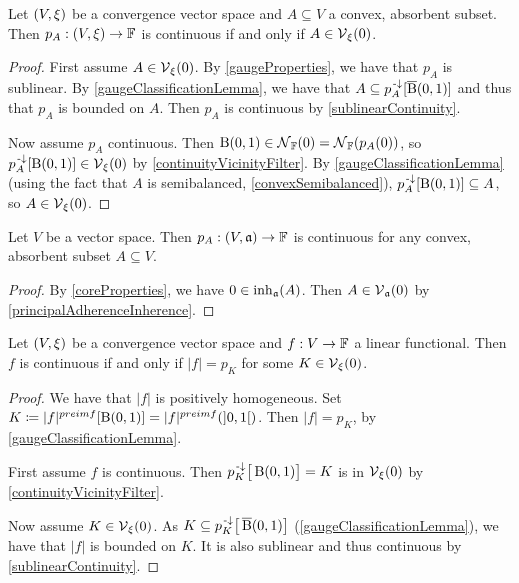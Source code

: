 \begin{proposition} \label{continuityConvexGauge}
Let $\left( V, \xi \right)$ be a convergence vector space and $A\subseteq V$ a convex, absorbent subset. Then $p_A: \left( V,\xi \right) \to \mathbb{F}$ is continuous \textup{if and only if} $A\in\operatorname{\mathcal{V}}_\xi(0)$.
\end{proposition}
\begin{proof}
First assume $A\in\operatorname{\mathcal{V}}_\xi(0)$. By \ref{gaugeProperties}, we have that $p_A$ is sublinear. By \ref{gaugeClassificationLemma}, we have that $A \subseteq p_A^{\text{\hspace{0.15em}-}\downarrow}[\operatorname{\overline{B}}(0,1)]$ and thus that $p_A$ is bounded on $A$. Then $p_A$ is continuous by \ref{sublinearContinuity}.

Now assume $p_A$ continuous. Then $\operatorname{B}(0,1) \in \operatorname{\mathcal{N}}_{\mathbb{F}}(0) = \operatorname{\mathcal{N}}_{\mathbb{F}}(p_A(0))$, so $p_A^{\text{\hspace{0.15em}-}\downarrow}[\operatorname{B}(0,1)] \in \operatorname{\mathcal{V}}_\xi(0)$ by \ref{continuityVicinityFilter}. By \ref{gaugeClassificationLemma} (using the fact that $A$ is semibalanced, \ref{convexSemibalanced}), $p_A^{\text{\hspace{0.15em}-}\downarrow}[\operatorname{B}(0,1)] \subseteq A$, so $A\in\operatorname{\mathcal{V}}_\xi(0)$.
\end{proof}
\begin{corollary} \label{gaugeContinuousAlgebraicConvergence}
Let $V$ be a vector space. Then $p_A: \left( V,\mathfrak{a} \right) \to \mathbb{F}$ is continuous for any convex, absorbent subset $A \subseteq V$.
\end{corollary}
\begin{proof}
By \ref{coreProperties}, we have $0\in\operatorname{inh}_\mathfrak{a}(A)$. Then $A\in \operatorname{\mathcal{V}}_\mathfrak{a}(0)$ by \ref{principalAdherenceInherence}.
\end{proof}

\begin{lemma} \label{absoluteFunctionalGauge}
Let $\left( V, \xi \right)$ be a convergence vector space and $f: V\to \mathbb{F}$ a linear functional. Then $f$ is continuous \textup{if and only if} $|f| = p_K$ for some $K\in\operatorname{\mathcal{V}}_\xi(0)$.
\end{lemma}
\begin{proof}
We have that $|f|$ is positively homogeneous. Set $K \defeq |f|^{preimf}[\ball(0,1)] = |f|^{preimf}(\interval[o]{0,1})$. Then $|f| = p_{K}$, by \ref{gaugeClassificationLemma}. 

First assume $f$ is continuous. Then $p_K^{\text{\hspace{0.15em}-}\downarrow}\big[\operatorname{B}(0,1)\big] = K$ is in $\operatorname{\mathcal{V}}_\xi(0)$ by \ref{continuityVicinityFilter}.

Now assume $K\in\operatorname{\mathcal{V}}_\xi(0)$. As $K \subseteq p_K^{\text{\hspace{0.15em}-}\downarrow}\big[\operatorname{\overline{B}}(0,1)\big]$ (\ref{gaugeClassificationLemma}), we have that $|f|$ is bounded on $K$. It is also sublinear and thus continuous by \ref{sublinearContinuity}.
\end{proof}



